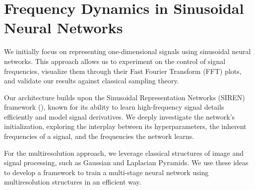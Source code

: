 \chapter{Frequency Dynamics in Sinusoidal Neural Networks}
\label{chap:sinusoidal}



We initially focus on representing one-dimensional signals using sinusoidal neural networks. This approach allows us to experiment on the control of signal frequencies, visualize them through their Fast Fourier Transform (FFT) plots, and validate our results against classical sampling theory.

Our architecture builds upon the Sinusoidal Representation Networks (SIREN) framework (\cite{sitzmann2019siren}), known for its ability to learn high-frequency signal details efficiently and model signal derivatives. We deeply investigate the network's initialization, exploring the interplay between its hyperparameters, the inherent frequencies of a signal, and the frequencies the network learns.

For the multiresolution approach, we leverage classical structures of image and signal processing, such as Gaussian and Laplacian Pyramids. We use these ideas to develop a framework to train a multi-stage neural network using multiresolution structures in an efficient way. 


